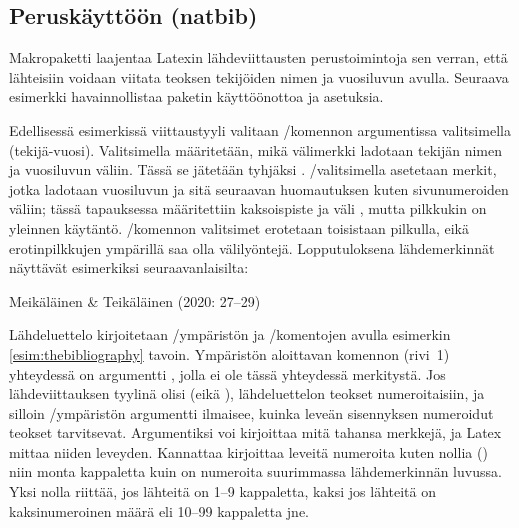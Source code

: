 \subsection{Peruskäyttöön (natbib)}
\label{luku:natbib}

Makropaketti  laajentaa Latexin
lähdeviittausten perustoimintoja sen verran, että lähteisiin voidaan
viitata teoksen tekijöiden nimen ja vuosiluvun avulla. Seuraava
esimerkki havainnollistaa paketin käyttöönottoa ja asetuksia.

\begin{koodilohkosis}
  \usepackage{natbib}
\end{koodilohkosis}

Edellisessä esimerkissä viittaustyyli valitaan \-/komennon argumentissa valitsimella
 (tekijä\--vuosi). Valitsimella 
määritetään, mikä välimerkki ladotaan tekijän nimen ja vuosiluvun
väliin. Tässä se jätetään tyhjäksi \koodi{\{\}}.
\-/valitsimella asetetaan merkit, jotka ladotaan
vuosiluvun ja sitä seuraavan huomautuksen kuten sivunumeroiden väliin;
tässä tapauksessa määritettiin kaksoispiste ja väli \koodi{\{:~\}},
mutta pilkkukin on yleinnen käytäntö. \-/komennon valitsimet erotetaan toisistaan pilkulla,
eikä erotinpilkkujen ympärillä saa olla välilyöntejä. Lopputuloksena
lähdemerkinnät näyttävät esimerkiksi seuraavanlaisilta:


\begin{koodilohkosis}
  \citet*[27--29]{johdatus} %
\end{koodilohkosis}

\begin{tulossis}
  Meikäläinen \& Teikäläinen (2020: 27--29)
\end{tulossis}

Lähdeluettelo kirjoitetaan \-/ympäristön ja
\-/komentojen avulla esimerkin
\ref{esim:thebibliography} tavoin. Ympäristön aloittavan komennon
(rivi~1) yhteydessä on argumentti , jolla ei ole tässä
yhteydessä merkitystä. Jos lähdeviittauksen tyylinä olisi
 (eikä ), lähdeluettelon teokset
numeroitaisiin, ja silloin \-/ympäristön
argumentti ilmaisee, kuinka leveän sisennyksen numeroidut teokset
tarvitsevat. Argumentiksi voi kirjoittaa mitä tahansa merkkejä, ja Latex
mittaa niiden leveyden. Kannattaa kirjoittaa leveitä numeroita kuten
nollia () niin monta kappaletta kuin on numeroita suurimmassa
lähdemerkinnän luvussa. Yksi nolla riittää, jos lähteitä on 1--9
kappaletta, kaksi jos lähteitä on kaksinumeroinen määrä eli 10--99
kappaletta jne.

